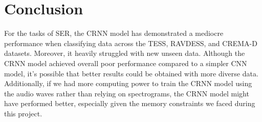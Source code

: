 \documentclass[../main.tex]{subfiles}
\begin{document}
\section{Conclusion}

For the tasks of SER, the CRNN model has demonstrated a mediocre performance when classifying data across the TESS, RAVDESS, and CREMA-D datasets.
Moreover, it heavily struggled with new unseen data. Although the CRNN model achieved overall poor performance compared to a simpler CNN model, it’s
possible that better results could be obtained with more diverse data. Additionally, if we had more computing power to train the CRNN model using the audio
waves rather than relying on spectrograms, the CRNN model might have performed better, especially given the memory constraints we faced during this project.
\end{document}

